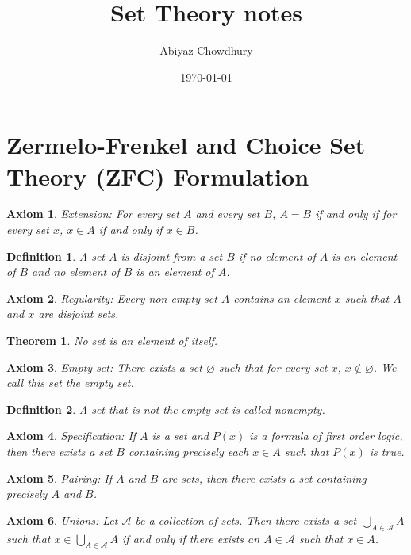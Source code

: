 \documentclass[a4paper]{article}
\title{\textbf{Set Theory notes}}
\author{Abiyaz Chowdhury}
\date{\today}
\newtheorem{mytheorem}{Theorem}
\newtheorem{axiom}{Axiom}
\newtheorem{mydef}{Definition}
\numberwithin{mytheorem}{section}
\numberwithin{mydef}{section}
\numberwithin{axiom}{section}
\numberwithin{example}{section}
\begin{document}
\maketitle

\section{Zermelo-Frenkel and Choice Set Theory (ZFC) Formulation}

\begin{axiom} Extension: For every set $A$ and every set $B$, $A = B$ if and only if for every set $x$, $x \in A$ if and only if $x \in B$. 
\end{axiom}

\begin{mydef} A set $A$ is disjoint from a set $B$ if no element of $A$ is an element of $B$ and no element of $B$ is an element of $A$. 
\end{mydef}

\begin{axiom} Regularity: Every non-empty set $A$ contains an element $x$ such that $A$ and $x$ are disjoint sets.
\end{axiom}

\begin{mytheorem} No set is an element of itself. \end{mytheorem}

\begin{axiom} Empty set: There exists a set $\varnothing$ such that for every set $x$, $x \notin \varnothing$. We call this set the empty set.
\end{axiom}

\begin{mydef} A set that is not the empty set is called nonempty.
\end{mydef}

\begin{axiom} Specification: If $A$ is a set and $P(x)$ is a formula of first order logic, then there exists a set $B$ containing precisely each $x \in A$ such that $P(x)$ is true. 
\end{axiom}

\begin{axiom} Pairing: If $A$ and $B$ are sets, then there exists a set containing precisely $A$ and $B$.
\end{axiom}

\begin{axiom} Unions: Let $\mathcal{A}$ be a collection of sets. Then there exists a set $\bigcup\limits_{A \in \mathcal{A}} A$ such that $x \in \bigcup\limits_{A \in \mathcal{A}} A$ if and only if there exists an $A \in \mathcal{A}$ such that $x \in A$.
\end{axiom}
\end{document}
